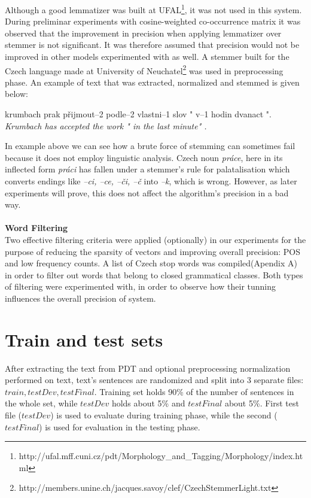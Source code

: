 Although a good lemmatizer was built at 
UFAL\footnote{http://ufal.mff.cuni.cz/pdt/Morphology\_and\_Tagging/Morphology/index.html}, it was not 
used 
in this system. During preliminar experiments with cosine-weighted co-occurrence matrix it was observed 
that the improvement in precision when applying lemmatizer over stemmer is not significant. It was 
therefore
assumed that precision would not be improved in other models experimented with as well. 
A stemmer built for the Czech language made at University of 
Neuchatel\footnote{http://members.unine.ch/jacques.savoy/clef/CzechStemmerLight.txt} was used in 
preprocessing 
phase.  An example of text that 
was extracted, normalized and stemmed is given below:
\begin{examples}
\item krumbach prak p\v{r}ijmout--2 podle--2 vlastni--1 slov " v--1 hodin dvanact ". 
\glt \textit{  Krumbach has accepted the work " in the last minute"  .} 
\end{examples}
In example above we can see how a brute force of stemming can sometimes fail because it does not employ linguistic analysis. Czech noun  \textit{pr\'ace}, here in its inflected form \textit{pr\'aci} has fallen under a stemmer's rule for palatalisation which converts endings like \textit{--ci, --ce, --\v{c}i, --\v{c}} into \textit{--k}, which is wrong. However, as later experiments will prove, this does not affect the algorithm's precision in a bad way.  
\\\\  \textbf{Word Filtering}
\\Two effective filtering criteria were applied (optionally) in our experiments for the purpose of reducing the sparsity of vectors and improving overall precision: POS and low frequency counts. A list of Czech stop words was compiled(Apendix A) in order to filter out words that belong to closed grammatical classes. Both types of filtering were experimented with, in order to observe how their tunning influences the overall precision of system.

\section{Train and test sets}\label{trainTestSet}

After extracting the text from PDT and optional preprocessing normalization performed on text, text's 
sentences are randomized and split into 3 separate files: $train, testDev, testFinal$. Training set holds 
90\% of the number of sentences in the whole set, while $testDev$ holds about 5\% and $testFinal$ 
about 5\%. First test file 
($testDev$) is used to evaluate during training phase, while the second ($ testFinal$) is used for 
evaluation in the testing phase. 

